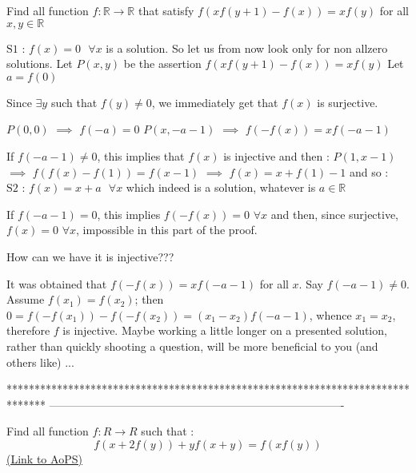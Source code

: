 \begin{solution}
	\begin{tcolorbox}Find all function $f:\mathbb{R}\to\mathbb{R}$ that satisfy $f(xf(y+1)-f(x))=xf(y)$ for all $x,y \in \mathbb{R}$\end{tcolorbox}
$\boxed{\text{S1 : }f(x)=0\text{  }\forall x}$ is a solution. So let us from now look only for non allzero solutions.
Let $P(x,y)$ be the assertion $f(xf(y+1)-f(x))=xf(y)$
Let $a=f(0)$

Since $\exists y$ such that $f(y)\ne 0$, we immediately get that $f(x)$ is surjective.

$P(0,0)$ $\implies$ $f(-a)=0$
$P(x,-a-1)$ $\implies$ $f(-f(x))=xf(-a-1)$

If $f(-a-1)\ne 0$, this implies that $f(x)$ is injective and then :
$P(1,x-1)$ $\implies$ $f(f(x)-f(1))=f(x-1)$ $\implies$ $f(x)=x+f(1)-1$ and so :
$\boxed{\text{S2 : }f(x)=x+a\text{  }\forall x}$ which indeed is a solution, whatever is $a\in\mathbb R$

If $f(-a-1)=0$, this implies $f(-f(x))=0$ $\forall x$ and then, since surjective, $f(x)=0$ $\forall x$, impossible in this part of the proof.
\end{solution}



\begin{solution}
	How can we have it is injective???
\end{solution}



\begin{solution}
	It was obtained that $f(-f(x)) = xf(-a-1)$ for all $x$. Say $f(-a-1) \neq 0$.
Assume $f(x_1)=f(x_2)$; then $0 = f(-f(x_1))  - f(-f(x_2))  = (x_1-x_2)f(-a-1)$, whence $x_1=x_2$, therefore $f$ is injective. 
Maybe working a little longer on a presented solution, rather than quickly shooting a question, will be more beneficial to you (and others like) ...
\end{solution}
*******************************************************************************
-------------------------------------------------------------------------------

\begin{problem}
	Find all function $f:R\rightarrow R$  such that : 
                                                                              \[f(x+2f(y))+yf(x+y)=f(xf(y))\]
	\flushright \href{https://artofproblemsolving.com/community/c6h617399}{(Link to AoPS)}
\end{problem}




